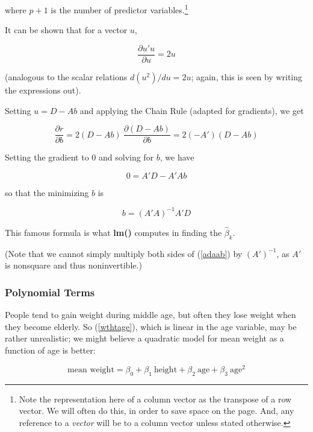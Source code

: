 where $p+1$ is the number of predictor variables.\footnote{Note the
representation here of a column vector as the transpose of a row vector.
We will often do this, in order to save space on the page.  And, any
reference to a \textit{vector} will be to a column vector unless stated
otherwise.}

It can be shown that for a vector $u$, 

\begin{equation}
\frac{\partial u'u}{\partial u} = 2u
\end{equation}

(analogous to the scalar relations $d (u^2) /du = 2u$; again, this is
seen by writing the expressions out).

Setting $u = D - Ab$ and applying the Chain Rule (adapted for
gradients), we get

\begin{equation}
\frac{\partial r}{\partial b} = 
2(D - Ab) ~ \frac{\partial (D - Ab)}{\partial b}=
2 (-A') (D - Ab) 
\end{equation}

Setting the gradient to 0 and solving for $b$, we have

\begin{equation}
\label{adaab}
0 = A'D - A'Ab
\end{equation}

so that the minimizing $b$ is

\begin{equation}
\label{famouslm}
b = (A'A)^{-1} A'D
\end{equation}

This famous formula is what \textbf{lm()} computes in finding the
$\widehat{\beta}_k$.

(Note that we cannot simply multiply both sides of (\ref{adaab}) by
$(A')^{-1}$, as $A'$ is nonsquare and thus noninvertible.)

\subsubsection{Polynomial Terms}
\label{poly}

People tend to gain weight during middle age, but often they lose weight
when they become elderly.  So (\ref{wthtage}), which is linear in the
age variable, may be rather unrealistic; we might believe a quadratic
model for mean weight as a function of age is better:

\begin{equation}
\label{wthtage2}
\textrm{mean weight} = \beta_0 + \beta_1 ~ \textrm{height} + 
\beta_2 ~ \textrm{age} +
\beta_3 ~ \textrm{age}^2
\end{equation}

